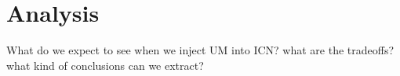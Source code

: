\section{Analysis}
\color{red}
What do we expect to see when we inject UM into ICN? what are the tradeoffs? what kind of conclusions can we extract?
\color{black}